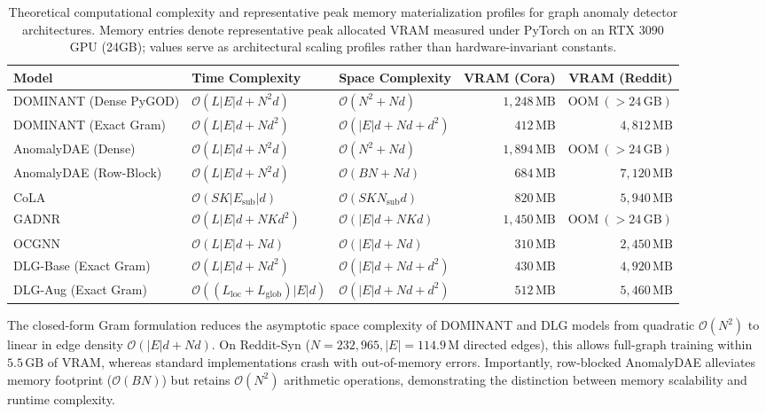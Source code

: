 \documentclass[applsci,article,submit,moreauthors,pdftex]{Definitions/mdpi}
\begin{document}
\begin{table}[htbp]
\centering\footnotesize\setlength{\tabcolsep}{3pt}
\caption{Theoretical computational complexity and representative peak memory materialization profiles for graph anomaly detector architectures. Memory entries denote representative peak allocated VRAM measured under PyTorch on an RTX 3090 GPU (24GB); values serve as architectural scaling profiles rather than hardware-invariant constants.}
\label{tab:complexity_comparison}
\begin{tabularx}{\textwidth}{lXXrr}\toprule
\textbf{Model} & \textbf{Time Complexity} & \textbf{Space Complexity} & \textbf{VRAM (Cora)} & \textbf{VRAM (Reddit)} \\\midrule
DOMINANT (Dense PyGOD) & $\mathcal{O}(L |E| d + N^2 d)$ & $\mathcal{O}(N^2 + N d)$ & $1,248\,\mathrm{MB}$ & $\mathrm{OOM}\ (>24\,\mathrm{GB})$ \\
DOMINANT (Exact Gram) & $\mathcal{O}(L |E| d + N d^2)$ & $\mathcal{O}(|E| d + N d + d^2)$ & $412\,\mathrm{MB}$ & $4,812\,\mathrm{MB}$ \\
AnomalyDAE (Dense) & $\mathcal{O}(L |E| d + N^2 d)$ & $\mathcal{O}(N^2 + N d)$ & $1,894\,\mathrm{MB}$ & $\mathrm{OOM}\ (>24\,\mathrm{GB})$ \\
AnomalyDAE (Row-Block) & $\mathcal{O}(L |E| d + N^2 d)$ & $\mathcal{O}(B N + N d)$ & $684\,\mathrm{MB}$ & $7,120\,\mathrm{MB}$ \\
CoLA & $\mathcal{O}(S K |E_{\mathrm{sub}}| d)$ & $\mathcal{O}(S K N_{\mathrm{sub}} d)$ & $820\,\mathrm{MB}$ & $5,940\,\mathrm{MB}$ \\
GADNR & $\mathcal{O}(L |E| d + N K d^2)$ & $\mathcal{O}(|E| d + N K d)$ & $1,450\,\mathrm{MB}$ & $\mathrm{OOM}\ (>24\,\mathrm{GB})$ \\
OCGNN & $\mathcal{O}(L |E| d + N d)$ & $\mathcal{O}(|E| d + N d)$ & $310\,\mathrm{MB}$ & $2,450\,\mathrm{MB}$ \\
DLG-Base (Exact Gram) & $\mathcal{O}(L |E| d + N d^2)$ & $\mathcal{O}(|E| d + N d + d^2)$ & $430\,\mathrm{MB}$ & $4,920\,\mathrm{MB}$ \\
DLG-Aug (Exact Gram) & $\mathcal{O}((L_{\mathrm{loc}} + L_{\mathrm{glob}}) |E| d)$ & $\mathcal{O}(|E| d + N d + d^2)$ & $512\,\mathrm{MB}$ & $5,460\,\mathrm{MB}$ \\\bottomrule
\end{tabularx}
\end{table}

The closed-form Gram formulation reduces the asymptotic space complexity of DOMINANT and DLG models from quadratic $\mathcal{O}(N^2)$ to linear in edge density $\mathcal{O}(|E| d + N d)$. On Reddit-Syn ($N=232,965, |E|=114.9\,\mathrm{M}$ directed edges), this allows full-graph training within $5.5\,\mathrm{GB}$ of VRAM, whereas standard implementations crash with out-of-memory errors. Importantly, row-blocked AnomalyDAE alleviates memory footprint ($\mathcal{O}(B N)$) but retains $\mathcal{O}(N^2)$ arithmetic operations, demonstrating the distinction between memory scalability and runtime complexity.
\end{document}
